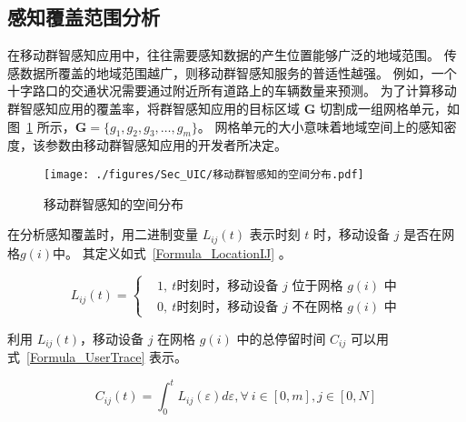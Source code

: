 \subsection{感知覆盖范围分析}

在移动群智感知应用中，往往需要感知数据的产生位置能够广泛的地域范围。
传感数据所覆盖的地域范围越广，则移动群智感知服务的普适性越强。
例如，一个十字路口的交通状况需要通过附近所有道路上的车辆数量来预测。
为了计算移动群智感知应用的覆盖率，将群智感知应用的目标区域 $\boldsymbol{G}$ 切割成一组网格单元，如图~\ref{Figure_CoverageofArea} 所示，$\boldsymbol{G} = \{g_1,g_2,g_3,\ldots,g_m\}$。
网格单元的大小意味着地域空间上的感知密度，该参数由移动群智感知应用的开发者所决定。

\begin{figure}[!h]
  \centering
  \texttt{[image: ./figures/Sec\_UIC/移动群智感知的空间分布.pdf]}
  \vspace{-0.5em}
  \caption{移动群智感知的空间分布}
  \vspace{-0.5em}
  \label{Figure_CoverageofArea}
\end{figure}

在分析感知覆盖时，用二进制变量 $L_{ij}(t)$ 表示时刻 $t$ 时，移动设备 $j$ 是否在网格$g(i)$中。
其定义如式~\eqref{Formula_LocationIJ} 。

\begin{equation}
  \label{Formula_LocationIJ}
  L_{ij}(t) = \left \{
  \begin{aligned}
  & 1,\ \text{$t$时刻时，移动设备 $j$ 位于网格 $g(i)$ 中}\\
  & 0,\ \text{$t$时刻时，移动设备 $j$ 不在网格 $g(i)$ 中}
  \end{aligned}
  \right.
\end{equation}

利用 $L_{ij}(t)$，移动设备 $j$ 在网格 $g(i)$ 中的总停留时间 $C_{ij}$ 可以用式~\eqref{Formula_UserTrace} 表示。

\begin{equation}
  \label{Formula_UserTrace}
  C_{ij}(t) = \int_{0}^{t}L_{ij}(\varepsilon )d\varepsilon , \forall \ i \in [0,m], j \in [0,N]
\end{equation}

